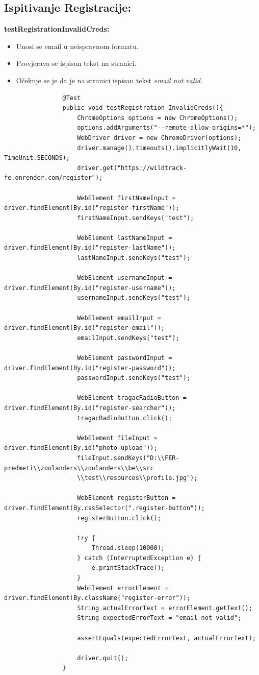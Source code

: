			\subsection{Ispitivanje Registracije:}
			\textbf{testRegistrationInvalidCreds:}
			\begin{itemize}
				\item Unosi se email u neispravnom formatu.
				\item Provjerava se ispisan tekst na stranici.
				\item Očekuje se je da je na stranici ispisan tekst \textit{email not valid}.
			\end{itemize}
			\begin{lstlisting}
				@Test
				public void testRegistration_InvalidCreds(){
					ChromeOptions options = new ChromeOptions();
					options.addArguments("--remote-allow-origins=*");
					WebDriver driver = new ChromeDriver(options);
					driver.manage().timeouts().implicitlyWait(10, TimeUnit.SECONDS);
					driver.get("https://wildtrack-fe.onrender.com/register");
					
					WebElement firstNameInput = driver.findElement(By.id("register-firstName"));
					firstNameInput.sendKeys("test");
					
					WebElement lastNameInput = driver.findElement(By.id("register-lastName"));
					lastNameInput.sendKeys("test");
					
					WebElement usernameInput = driver.findElement(By.id("register-username"));
					usernameInput.sendKeys("test");
					
					WebElement emailInput = driver.findElement(By.id("register-email"));
					emailInput.sendKeys("test");
					
					WebElement passwordInput = driver.findElement(By.id("register-password"));
					passwordInput.sendKeys("test");
					
					WebElement tragacRadioButton = driver.findElement(By.id("register-searcher"));
					tragacRadioButton.click();
					
					WebElement fileInput = driver.findElement(By.id("photo-upload"));
					fileInput.sendKeys("D:\\FER-predmeti\\zoolanders\\zoolanders\\be\\src
					\\test\\resources\\profile.jpg");
					
					WebElement registerButton = driver.findElement(By.cssSelector(".register-button"));
					registerButton.click();
					
					try {
						Thread.sleep(10000);
					} catch (InterruptedException e) {
						e.printStackTrace();
					}
					WebElement errorElement = driver.findElement(By.className("register-error"));
					String actualErrorText = errorElement.getText();
					String expectedErrorText = "email not valid";
					
					assertEquals(expectedErrorText, actualErrorText);
					
					driver.quit();
				}
			\end{lstlisting}
			
